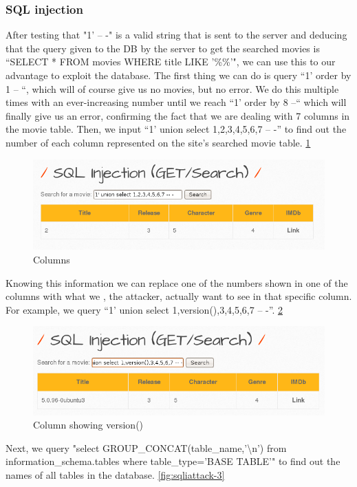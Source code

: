 \documentclass{article}
\begin{document}
\subsubsection{SQL injection}
\label{section:sql-injection-exploit}
After testing that "1' -- -" is a valid string that is sent to the server and deducing that the query given to the DB by the server to get the searched movies is “SELECT * FROM movies WHERE title LIKE '\%\%'", we can use this to our advantage to exploit the database. The first thing we can do is query “1’ order by 1 -- “, which will of course give us no movies, but no error. We do this multiple times with an ever-increasing number until we reach “1’ order by 8 --“ which will finally give us an error, confirming the fact that we are dealing with 7 columns in the movie table.
Then, we input “1' union select 1,2,3,4,5,6,7 -- -” to find out the number of each column represented on the site’s searched movie table. \ref{fig:sqliattack-1}
\begin{figure}
    \centering
    \includegraphics[width=1\linewidth]{Figures/sqli/sqliattack-1.png}
    \caption{\label{fig:sqliattack-1}Columns}
\end{figure}
Knowing this information we can replace one of the numbers shown in one of the columns with what we , the attacker, actually want to see in that specific column. For example, we query “1’ union select 1,version(),3,4,5,6,7 -- -”. \ref{fig:sqliattack-2}
\begin{figure}
    \centering
    \includegraphics[width=1\linewidth]{Figures/sqli/sqliattack-2.png}
    \caption{\label{fig:sqliattack-2}Column showing version()}
\end{figure}
Next, we query "select GROUP\_CONCAT(table\_name,'\textbackslash n') from information\_schema.tables where table\_type='BASE TABLE'" to find out the names of all tables in the database. \ref{fig:sqliattack-3}
\end{document}
